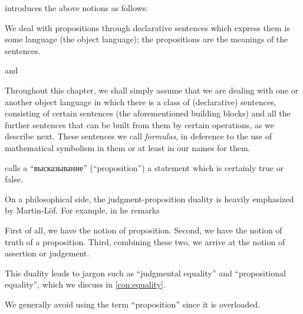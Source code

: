 \begin{comments}
  \item {} introduces the above notions as follows:
  \begin{displayquote}
    We deal with propositions through declarative sentences which express them is some language (the object language); the propositions are the
    meanings of the sentences.
  \end{displayquote}
  and
  \begin{displayquote}
    Throughout this chapter, we shall simply assume that we are dealing with one or another object language in which there is a class of (declarative) sentences, consisting of certain sentences (the aforementioned building blocks) and all the further sentences that can be built from them by certain operations, as we describe next. These sentences we call \textit{formulas}, in deference to the use of mathematical symbolism in them or at least in our names for them.
  \end{displayquote}

   calls a \enquote{высказывание} (\enquote{proposition}) a statement which is certainly true or false.

  \item On a philosophical side, the judgment-proposition duality is heavily emphasized by Martin-L\"of. For example, in \cite[409]{MartinLöf1987Judgments} he remarks
  \begin{displayquote}
    First of all, we have the notion of proposition. Second, we have the notion of truth of a proposition. Third, combining these two, we arrive at the notion of assertion or judgement.
  \end{displayquote}

  This duality leads to jargon such as \enquote{judgmental equality} and \enquote{propositional equality}, which we discuss in \cref{con:equality}.

  \item We generally avoid using the term \enquote{proposition} since it is overloaded.
\end{comments}

